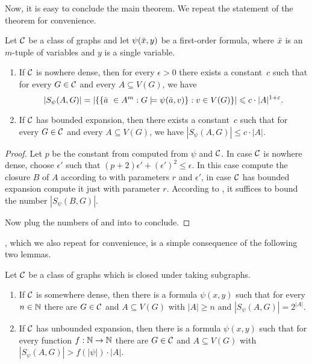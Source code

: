 Now, it is easy to conclude the main theorem. We repeat the statement of the theorem 
for convenience.

\setcounter{theorem}{2}
\begin{theorem}
Let $\mathcal{C}$ be a class of graphs and let $\psi(\bar{x},y)$ be a first-order formula, where 
$\bar{x}$ is an $m$-tuple of variables and $y$ is a single variable. 
\begin{enumerate}
\item If $\mathcal{C}$ is nowhere dense, then for every $\epsilon>0$ 
there exists a constant~$c$ such that for every $G\in \mathcal{C}$ and every
$A\subseteq V(G)$, we have 
\[|S_\psi(A,G)|=|\{\{\bar{a}\ \in A^m : G\models\psi(\bar{a},v)\} : v\in V(G)\}|\leqslant c\cdot |A|^{1+\varepsilon}.\]
\item If $\mathcal{C}$ has bounded expansion, then there exists a constant~$c$ such that for every $G\in \mathcal{C}$ and every $A\subseteq V(G)$, we have $|S_\psi(A,G)|\leq c\cdot |A|$.
\end{enumerate}
\end{theorem}
\begin{proof}
Let $p$ be the constant from  computed
from $\psi$ and $\mathcal{C}$. In case $\mathcal{C}$ is nowhere dense, choose
$\epsilon'$ such that $(p+2)\epsilon'+(\epsilon')^2\leq \epsilon$. In this case 
compute the closure $B$ of $A$ according to  with 
parameters $r$ and $\epsilon'$, in case $\mathcal{C}$ has bounded expansion 
compute it just with parameter $r$. 
According to , it suffices to bound the
number $|S_\psi(B,G)|$. 

Now plug the numbers of  and  
into  to conclude. 
\end{proof}

, which we also repeat for
convenience, is a simple consequence of the following two
lemmas. 

\begin{theorem}
Let $\mathcal{C}$ be a class of graphs which 
is closed under taking subgraphs. 
\begin{enumerate}
\item If $\mathcal{C}$ is somewhere dense, then there is a formula 
$\psi(x,y)$ such that for every $n\in \mathbb{N}$ there are $G\in\mathcal{C}$ and $A\subseteq V(G)$ 
with $|A|\geq n$ and $|S_\psi(A,G)|=2^{|A|}$. 
\item If $\mathcal{C}$ has unbounded expansion, then there is a formula 
$\psi(x,y)$ such that for every function $f:\mathbb{N}\rightarrow \mathbb{N}$ 
there are $G\in\mathcal{C}$ and $A\subseteq V(G)$ 
with $|S_\psi(A,G)|>f(|\psi|)\cdot |A|$. 
\end{enumerate}
\end{theorem}

